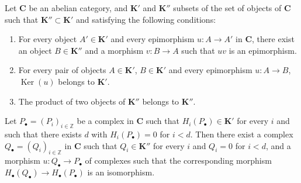 \begin{proposition}[11.9.1]
\label{0.11.9.1}
Let $\boldsymbol{C}$ be an abelian category, and $\boldsymbol{K}'$ and $\boldsymbol{K}''$ subsets of
the set of objects of $\boldsymbol{C}$ such that $\boldsymbol{K}''\subset\boldsymbol{K}'$ and
satisfying the following conditions:
\begin{enumerate}
\item[{\rm(i)}] For every object $A'\in\boldsymbol{K}'$ and every epimorphism
$u:A\to A'$ in $\boldsymbol{C}$, there exist an object $B\in\boldsymbol{K}''$ and a morphism
$v:B\to A$ such that $uv$ is an epimorphism.
\item[{\rm(ii)}] For every pair of objects $A\in\boldsymbol{K}'$, $B\in\boldsymbol{K}'$ and
every epimorphism $u:A\to B$, $\operatorname{Ker}(u)$ belongs to $\boldsymbol{K}'$.
\item[{\rm(iii)}] The product of two objects of $\boldsymbol{K}''$ belongs to
$\boldsymbol{K}''$.
\end{enumerate}
Let $P_\bullet=(P_i)_{i\in\mathbb Z}$ be a complex in $\boldsymbol{C}$
such that $H_i(P_\bullet)\in\boldsymbol{K}'$ for every $i$ and such that there exists $d$
with $H_i(P_\bullet)=0$ for $i<d$. Then there exist a complex
$Q_\bullet=(Q_i)_{i\in\mathbb Z}$ in $\boldsymbol{C}$ such that $Q_i\in\boldsymbol{K}''$
for every $i$ and $Q_i=0$ for $i<d$, and a morphism
$u:Q_\bullet\to P_\bullet$ of complexes such that the corresponding morphism
$H_\bullet(Q_\bullet)\to H_\bullet(P_\bullet)$ is an isomorphism.
\end{proposition}

